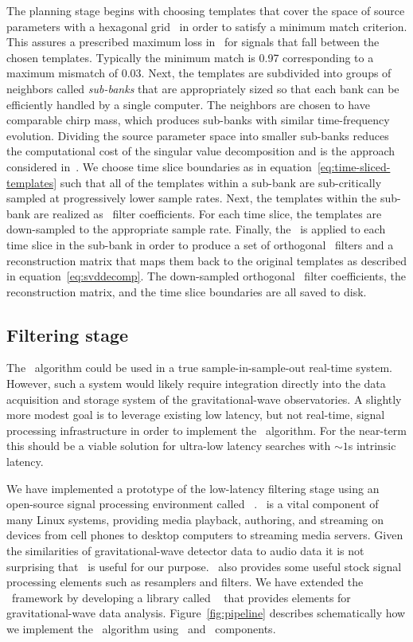 The planning stage begins with choosing templates that cover the space of
source parameters with a hexagonal grid~\cite{PhysRevD.76.102004} in order to
satisfy a minimum match criterion.  This assures a prescribed maximum loss in
\SNR\ for signals that fall between the chosen templates.  Typically the
minimum match is 0.97 corresponding to a maximum mismatch of 0.03.  Next, the
templates are subdivided into groups of neighbors called \emph{sub-banks} that
are appropriately sized so that each bank can be efficiently handled by a
single computer.  The neighbors are chosen to have comparable chirp mass, which
produces sub-banks with similar time-frequency evolution.  Dividing the source
parameter space into smaller sub-banks reduces the computational cost of the
singular value decomposition and is the approach considered
in~\cite{Cannon:2010p10398}.  We choose time slice boundaries as in
equation~\eqref{eq:time-sliced-templates} such that all of the templates within
a sub-bank are sub-critically sampled at progressively lower sample rates.
Next, the templates within the sub-bank are realized as \fir\ filter
coefficients.  For each time slice, the templates are down-sampled to the
appropriate sample rate.  Finally, the \SVD\ is applied to each time slice in
the sub-bank in order to produce a set of orthogonal \fir\ filters and a
reconstruction matrix that maps them back to the original templates as
described in equation~\eqref{eq:svddecomp}.  The down-sampled orthogonal \fir\
filter coefficients, the reconstruction matrix, and the time slice boundaries
are all saved to disk.

\subsection{Filtering stage}

The \lloid\ algorithm could be used in a true sample-in-sample-out real-time
system.  However, such a system would likely require integration directly into
the data acquisition and storage system of the gravitational-wave
observatories.  A slightly more modest goal is to leverage existing low
latency, but not real-time, signal processing infrastructure in order to
implement the \lloid\ algorithm.  For the near-term this should be a viable 
solution for ultra-low latency searches with $\sim 1$s intrinsic latency.

We have implemented a prototype of the low-latency filtering stage using an
open-source signal processing environment called \gstreamer\ \cite{gstreamer}.
\gstreamer\ is a vital component of many Linux systems, providing media
playback, authoring, and streaming on devices from cell phones to desktop
computers to streaming media servers.  Given the similarities of
gravitational-wave detector data to audio data it is not surprising that
\gstreamer\ is
useful for our purpose. \gstreamer\ also provides some useful stock signal
processing elements such as resamplers and filters.  We have extended the
\gstreamer\ framework by developing a library called \gstlal{}~\cite{gstlal}
that provides elements for gravitational-wave data analysis.
Figure~\ref{fig:pipeline} describes schematically how we implement the \lloid\
algorithm using \gstlal\ and \gstreamer\ components.

